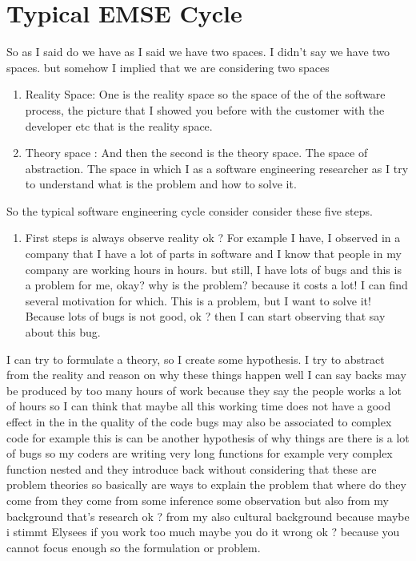 \documentclass[conference, compsoc, twoside]{IEEEtran}
\begin{document}
\section{Typical EMSE Cycle} %
\label{sec:typical_emse_cycle_}

 So as I said do we have as I said we have two spaces. I didn't say we have two spaces. but somehow I implied that we are considering two spaces 
 \begin{enumerate}
 	\item Reality Space: One is the reality space so the space of the of the software process, the picture that I showed you before with the customer with the developer etc that is the reality space.
 	\item Theory space : And then the second is the theory space. The space of abstraction. 
 	The space in which I as a software engineering researcher as I try to understand what is the problem and how to solve it. 
 \end{enumerate}
So the typical software engineering cycle consider consider these five steps.
\begin{enumerate}
	\item First steps is always observe reality ok ?  For example I have, I observed in a company that I have a lot of parts in software and I know that people in my company are working hours in hours.
but still, I have lots of bugs and this is a problem for me, okay? 
why is the problem? because it costs a lot! I can find several motivation for which. 
This is a problem, but I want to solve it! 
Because lots of bugs is not good, ok ? then I can start observing that say about this bug.

\end{enumerate}

I can try to formulate a theory, so I create some hypothesis. 
I try to abstract from the reality and reason on why these things happen well I can say backs may be produced by too many hours of work because they say the people works a lot of hours 
so I can think that maybe all this working time does not have a good effect in the in the quality of the code bugs may also be associated to complex code 
for example this is can be another hypothesis of why things are there is a lot of bugs so my coders are writing very long functions 
for example very complex function nested and they introduce back without considering that these are problem theories so basically are ways to explain the problem that where do they come from they come from some inference some observation but also from my background that's research ok ? from my also cultural background because maybe i stimmt Elysees if you work too much maybe you do it wrong ok ? because you cannot focus enough so the formulation or problem.
\end{document}
